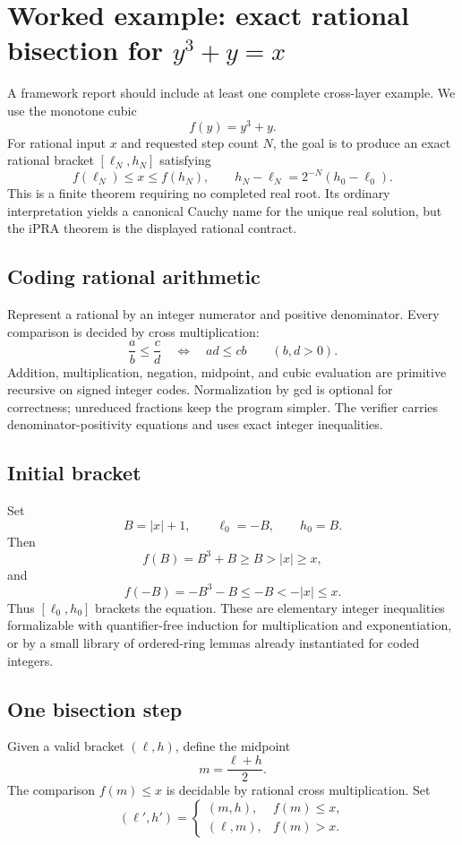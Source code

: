 \section{Worked example: exact rational bisection for \texorpdfstring{$y^3+y=x$}{y3+y=x}}
\label{sec:cubic}

A framework report should include at least one complete cross-layer example.  We use the monotone cubic
\[
 f(y)=y^3+y.
\]
For rational input \(x\) and requested step count \(N\), the goal is to produce an exact rational bracket
\([\ell_N,h_N]\) satisfying
\[
 f(\ell_N)\le x\le f(h_N),
 \qquad
 h_N-\ell_N=2^{-N}(h_0-\ell_0).
\]
This is a finite theorem requiring no completed real root.  Its ordinary interpretation yields a canonical
Cauchy name for the unique real solution, but the iPRA theorem is the displayed rational contract.

\subsection{Coding rational arithmetic}

Represent a rational by an integer numerator and positive denominator.  Every comparison is decided by
cross multiplication:
\[
 \frac ab\le\frac cd
 \quad\Longleftrightarrow\quad
 ad\le cb
 \qquad(b,d>0).
\]
Addition, multiplication, negation, midpoint, and cubic evaluation are primitive recursive on signed
integer codes.  Normalization by gcd is optional for correctness; unreduced fractions keep the program
simpler.  The verifier carries denominator-positivity equations and uses exact integer inequalities.

\subsection{Initial bracket}

Set
\[
 B=|x|+1,
 \qquad \ell_0=-B,
 \qquad h_0=B.
\]
Then
\[
 f(B)=B^3+B\ge B>|x|\ge x,
\]
and
\[
 f(-B)=-B^3-B\le -B<-|x|\le x.
\]
Thus \([\ell_0,h_0]\) brackets the equation.  These are elementary integer inequalities formalizable with
quantifier-free induction for multiplication and exponentiation, or by a small library of ordered-ring
lemmas already instantiated for coded integers.

\subsection{One bisection step}

Given a valid bracket \((\ell,h)\), define the midpoint
\[
 m=\frac{\ell+h}{2}.
\]
The comparison \(f(m)\le x\) is decidable by rational cross multiplication.  Set
\[
 (\ell',h')=
 \begin{cases}
   (m,h),& f(m)\le x,\\
   (\ell,m),& f(m)>x.
 \end{cases}
\]

